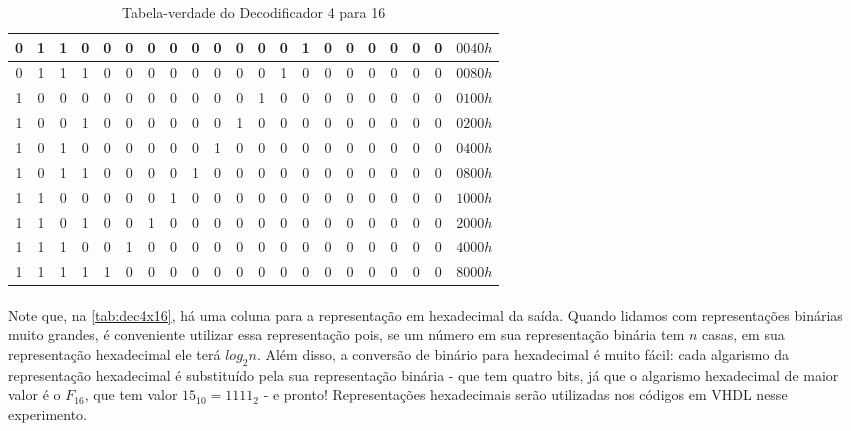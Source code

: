 \documentclass[a4paper,12pt]{article}
\begin{document}
\begin{table}[H]
\begin{tabular}{|cccc|cccccccccccccccc|c|}
        0 & 1 & 1 & 0 & 0 & 0 & 0 & 0 & 0 & 0 & 0 & 0 & 0 & 1 & 0 & 0 & 0 & 0 & 0 & 0 & $0040h$ \\ \hline
        \rowcolor{cinza}
        0 & 1 & 1 & 1 & 0 & 0 & 0 & 0 & 0 & 0 & 0 & 0 & 1 & 0 & 0 & 0 & 0 & 0 & 0 & 0 & $0080h$ \\ \hline
        1 & 0 & 0 & 0 & 0 & 0 & 0 & 0 & 0 & 0 & 0 & 1 & 0 & 0 & 0 & 0 & 0 & 0 & 0 & 0 & $0100h$ \\ \hline
        \rowcolor{cinza}
        1 & 0 & 0 & 1 & 0 & 0 & 0 & 0 & 0 & 0 & 1 & 0 & 0 & 0 & 0 & 0 & 0 & 0 & 0 & 0 & $0200h$ \\ \hline
        1 & 0 & 1 & 0 & 0 & 0 & 0 & 0 & 0 & 1 & 0 & 0 & 0 & 0 & 0 & 0 & 0 & 0 & 0 & 0 & $0400h$ \\ \hline
        \rowcolor{cinza}
        1 & 0 & 1 & 1 & 0 & 0 & 0 & 0 & 1 & 0 & 0 & 0 & 0 & 0 & 0 & 0 & 0 & 0 & 0 & 0 & $0800h$ \\ \hline
        1 & 1 & 0 & 0 & 0 & 0 & 0 & 1 & 0 & 0 & 0 & 0 & 0 & 0 & 0 & 0 & 0 & 0 & 0 & 0 & $1000h$ \\ \hline
        \rowcolor{cinza}
        1 & 1 & 0 & 1 & 0 & 0 & 1 & 0 & 0 & 0 & 0 & 0 & 0 & 0 & 0 & 0 & 0 & 0 & 0 & 0 & $2000h$ \\ \hline
        1 & 1 & 1 & 0 & 0 & 1 & 0 & 0 & 0 & 0 & 0 & 0 & 0 & 0 & 0 & 0 & 0 & 0 & 0 & 0 & $4000h$ \\ \hline
        \rowcolor{cinza}
        1 & 1 & 1 & 1 & 1 & 0 & 0 & 0 & 0 & 0 & 0 & 0 & 0 & 0 & 0 & 0 & 0 & 0 & 0 & 0 & $8000h$ \\ \hline
    \end{tabular}
    \caption{Tabela-verdade do Decodificador 4 para 16}
    \label{tab:dec4x16}
    \vspace{-20pt}
\end{table}

\paragraph{}
Note que, na \autoref{tab:dec4x16}, há uma coluna para a representação em hexadecimal da saída. Quando lidamos com representações binárias muito grandes, é conveniente utilizar essa representação pois, se um número em sua representação binária tem $n$ casas, em sua representação hexadecimal ele terá $log_2 n$. Além disso, a conversão de binário para hexadecimal é muito fácil: cada algarismo da representação hexadecimal é substituído pela sua representação binária - que tem quatro bits, já que o algarismo hexadecimal de maior valor é o $F_{16}$, que tem valor $15_{10} = 1111_{2}$ - e pronto! Representações hexadecimais serão utilizadas nos códigos em VHDL nesse experimento.
\end{document}
